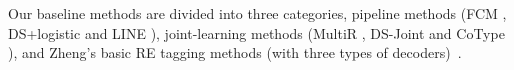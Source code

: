 Our baseline methods are divided into three categories, pipeline
methods (FCM \cite{Gormley2015}, DS+logistic
\cite{Mintz2009} and LINE \cite{Tang2015}), joint-learning methods
(MultiR \cite{Hoffmann2011}, DS-Joint \cite{Li2014}
and CoType \cite{Ren2017}), and Zheng's basic RE tagging methods (with
three types of decoders)~\cite{Zheng2017}.
%
%

